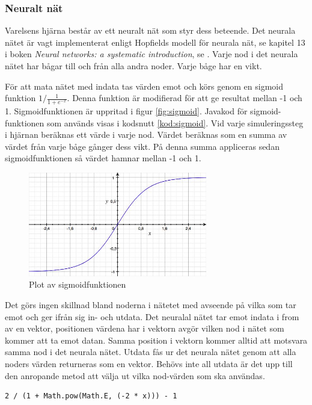\documentclass[titlepage, twocolumn, a4paper, 12pt, swedish]{article}
\begin{document}
\subsubsection{Neuralt nät}
Varelsens hjärna består av ett neuralt nät som styr dess beteende. Det neurala nätet är vagt implementerat enligt Hopfields modell för neurala nät, se kapitel 13 i boken \textit{Neural networks: a systematic introduction}, se \cite{raul}. Varje nod i det neurala nätet har bågar till och från alla andra noder. Varje båge har en vikt.

För att mata nätet med indata tas värden emot och körs genom en sigmoid funktion $1/\frac{1}{1 + e^{-x}}$. Denna funktion är modifierad för att ge resultat mellan -1 och 1. Sigmoidfunktionen är uppritad i figur \vref{fig:sigmoid}. Javakod för sigmoid-funktionen som används visas i kodsnutt \ref{kod:sigmoid}. Vid varje simuleringssteg i hjärnan beräknas ett värde i varje nod. Värdet beräknas som en summa av värdet från varje båge gånger dess vikt. På denna summa appliceras sedan sigmoidfunktionen så värdet hamnar mellan -1 och 1.

\begin{figure}
    \includegraphics[width=78mm]{images/sigmoid.jpg}
    \caption{Plot av sigmoidfunktionen}
    \label{fig:sigmoid}
\end{figure}

Det görs ingen skillnad bland noderna i nätetet med avseende på vilka som tar emot och ger ifrån sig in- och utdata. Det neuralal nätet tar emot indata i from av en vektor, positionen värdena har i vektorn avgör vilken nod i nätet som kommer att ta emot datan. Samma position i vektorn kommer alltid att motsvara samma nod i det neurala nätet. Utdata fås ur det neurala nätet genom att alla noders värden returneras som en vektor. Behövs inte all utdata är det upp till den anropande metod att välja ut vilka nod-värden som ska användas.

\begin{kod}
\begin{footnotesize}
\begin{verbatim}
2 / (1 + Math.pow(Math.E, (-2 * x))) - 1
\end{verbatim}
\end{footnotesize}
\caption{Sigmoid (java)}\label{kod:sigmoid}
\end{kod}
\end{document}
